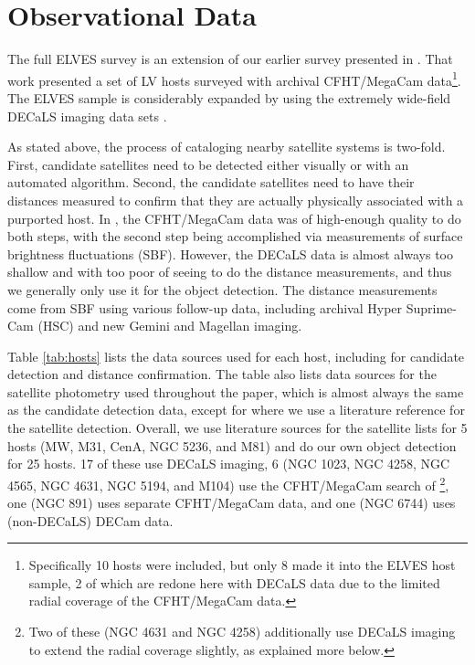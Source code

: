 \documentclass[twocolumn]{aastex62}
\begin{document}
\section{Observational Data}
\label{sec:data}
The full ELVES survey is an extension of our earlier survey presented in \citet{carlsten2020a, carlsten2020b}. That work presented a set of LV hosts surveyed with archival CFHT/MegaCam data\footnote{Specifically 10 hosts were included, but only 8 made it into the ELVES host sample, 2 of which are redone here with DECaLS data due to the limited radial coverage of the CFHT/MegaCam data.}. The ELVES sample is considerably expanded by using the extremely wide-field DECaLS imaging data sets \citep{decals, bass1, bass2}. 

As stated above, the process of cataloging nearby satellite systems is two-fold. First, candidate satellites need to be detected either visually or with an automated algorithm. Second, the candidate satellites need to have their distances measured to confirm that they are actually physically associated with a purported host. In \citet{carlsten2020a, carlsten2020b}, the CFHT/MegaCam data was of high-enough quality to do both steps, with the second step being accomplished via measurements of surface brightness fluctuations (SBF). However, the DECaLS data is almost always too shallow and with too poor of seeing to do the distance measurements, and thus we generally only use it for the object detection. The distance measurements come from SBF using various follow-up data, including archival Hyper Suprime-Cam (HSC) and new Gemini and Magellan imaging. 

Table \ref{tab:hosts} lists the data sources used for each host, including for candidate detection and distance confirmation. The table also lists data sources for the satellite photometry used throughout the paper, which is almost always the same as the candidate detection data, except for where we use a literature reference for the satellite detection. Overall, we use literature sources for the satellite lists for 5 hosts (MW, M31, CenA, NGC 5236, and M81) and do our own object detection for 25 hosts. 17 of these use DECaLS imaging, 6 (NGC 1023, NGC 4258, NGC 4565, NGC 4631, NGC 5194, and M104) use the CFHT/MegaCam search of \citet{carlsten2020a}\footnote{Two of these (NGC 4631 and NGC 4258) additionally use DECaLS imaging to extend the radial coverage slightly, as explained more below.}, one (NGC 891) uses separate CFHT/MegaCam data, and one (NGC 6744) uses (non-DECaLS) DECam data.  
\end{document}
